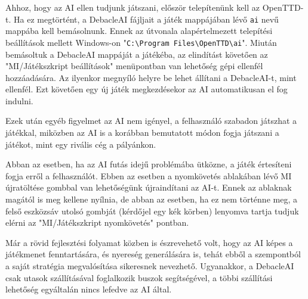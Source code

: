
\label{sec:installation}

Ahhoz, hogy az AI ellen tudjunk játszani, először telepítenünk kell az OpenTTD-t. Ha ez megtörtént, a DebacleAI fájljait a játék mappájában lévő \texttt{ai} nevű mappába kell bemásolnunk. Ennek az útvonala alapértelmezett telepítési beállítások mellett Windows-on "\texttt{C:\textbackslash Program Files\textbackslash OpenTTD\textbackslash ai}". Miután bemásoltuk a DebacleAI mappáját a játékéba, az elindítást követően az "MI/Játékszkript beállítások" menüpontban van lehetőség gépi ellenfél hozzáadására. Az ilyenkor megnyíló helyre be lehet állítani a DebacleAI-t, mint ellenfél. Ezt követően egy új játék megkezdésekor az AI automatikusan el fog indulni.

Ezek után egyéb figyelmet az AI nem igényel, a felhasználó szabadon játszhat a játékkal, miközben az AI is a korábban bemutatott módon fogja játszani a játékot, mint egy rivális cég a pályánkon.

Abban az esetben, ha az AI futás idejű problémába ütközne, a játék értesíteni fogja erről a felhasználót. Ebben az esetben a nyomkövetés ablakában lévő MI újratöltése gombbal van lehetőségünk újraindítani az AI-t. Ennek az ablaknak magától is meg kellene nyílnia, de abban az esetben, ha ez nem történne meg, a felső eszközsáv utolsó gombját (kérdőjel egy kék körben) lenyomva tartja tudjuk elérni az "MI/Játékszkript nyomkövetés" pontban.


Már a rövid fejlesztési folyamat közben is észrevehető volt, hogy az AI képes a játékmenet fenntartására, és nyereség generálására is, tehát ebből a szempontból a saját stratégia megvalósítása sikeresnek nevezhető. Ugyanakkor, a DebacleAI csak utasok szállításával foglalkozik buszok segítségével, a többi szállítási lehetőség egyáltalán nincs lefedve az AI által.

